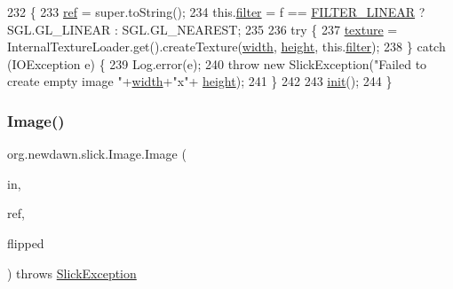 \begin{DoxyCode}
232                                                                      \{
233         \mbox{\hyperlink{classorg_1_1newdawn_1_1slick_1_1_image_a32694687591a80299d8b8ad1ea070cee}{ref}} = super.toString();
234         this.\mbox{\hyperlink{classorg_1_1newdawn_1_1slick_1_1_image_a1c6f09687817420f3762f32bb1c3ed76}{filter}} = f == \mbox{\hyperlink{classorg_1_1newdawn_1_1slick_1_1_image_ad3ba5404a81c4fad40140cbd517fae3d}{FILTER\_LINEAR}} ? SGL.GL\_LINEAR : SGL.GL\_NEAREST;
235         
236         \textcolor{keywordflow}{try} \{
237             \mbox{\hyperlink{classorg_1_1newdawn_1_1slick_1_1_image_a9fd9ddb21247305c83ac4e37d9d51f79}{texture}} = InternalTextureLoader.get().createTexture(\mbox{\hyperlink{classorg_1_1newdawn_1_1slick_1_1_image_a7d02c85e21b388428cfe5cc5c82714a1}{width}}, 
      \mbox{\hyperlink{classorg_1_1newdawn_1_1slick_1_1_image_a54397a37823bc59ddc79ec70dc5cf226}{height}}, this.\mbox{\hyperlink{classorg_1_1newdawn_1_1slick_1_1_image_a1c6f09687817420f3762f32bb1c3ed76}{filter}});
238         \} \textcolor{keywordflow}{catch} (IOException e) \{
239             Log.error(e);
240             \textcolor{keywordflow}{throw} \textcolor{keyword}{new} SlickException(\textcolor{stringliteral}{"Failed to create empty image "}+\mbox{\hyperlink{classorg_1_1newdawn_1_1slick_1_1_image_a7d02c85e21b388428cfe5cc5c82714a1}{width}}+\textcolor{stringliteral}{"x"}+
      \mbox{\hyperlink{classorg_1_1newdawn_1_1slick_1_1_image_a54397a37823bc59ddc79ec70dc5cf226}{height}});
241         \}
242         
243         \mbox{\hyperlink{classorg_1_1newdawn_1_1slick_1_1_image_a94d180c9218ba1444a0496a1898ec345}{init}}();
244     \}
\end{DoxyCode}
\mbox{\label{classorg_1_1newdawn_1_1slick_1_1_image_a1295aed103aae4b60eb8266e25c7b4e1}} 
\subsubsection{\texorpdfstring{Image()}{Image()}\hspace{0.1cm}{\footnotesize\ttfamily [11/16]}}
{\footnotesize\ttfamily org.\+newdawn.\+slick.\+Image.\+Image (\begin{DoxyParamCaption}\item[{Input\+Stream}]{in,  }\item[{String}]{ref,  }\item[{boolean}]{flipped }\end{DoxyParamCaption}) throws \mbox{\hyperlink{classorg_1_1newdawn_1_1slick_1_1_slick_exception}{Slick\+Exception}}\hspace{0.3cm}{\ttfamily [inline]}}

